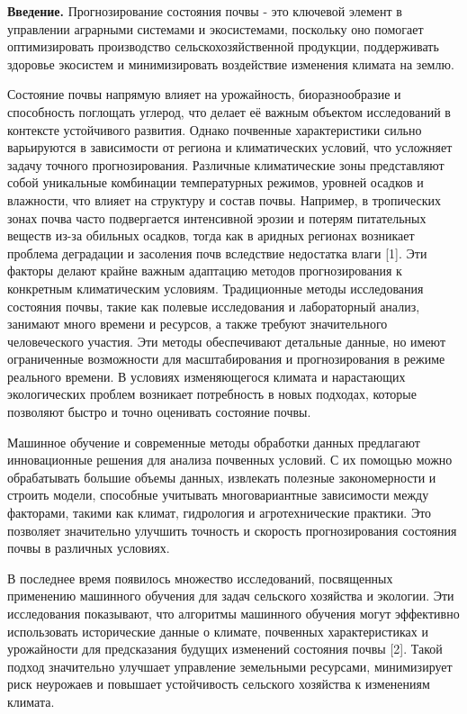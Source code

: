 \begin{multicols}{2}
{\bfseries Введение.} Прогнозирование состояния почвы - это ключевой
элемент в управлении аграрными системами и экосистемами, поскольку оно
помогает оптимизировать производство сельскохозяйственной продукции,
поддерживать здоровье экосистем и минимизировать воздействие изменения
климата на землю.

Состояние почвы напрямую влияет на урожайность, биоразнообразие и
способность поглощать углерод, что делает её важным объектом
исследований в контексте устойчивого развития. Однако почвенные
характеристики сильно варьируются в зависимости от региона и
климатических условий, что усложняет задачу точного прогнозирования.
Различные климатические зоны представляют собой уникальные комбинации
температурных режимов, уровней осадков и влажности, что влияет на
структуру и состав почвы. Например, в тропических зонах почва часто
подвергается интенсивной эрозии и потерям питательных веществ из-за
обильных осадков, тогда как в аридных регионах возникает проблема
деградации и засоления почв вследствие недостатка влаги {[}1{]}. Эти
факторы делают крайне важным адаптацию методов прогнозирования к
конкретным климатическим условиям. Традиционные методы исследования
состояния почвы, такие как полевые исследования и лабораторный анализ,
занимают много времени и ресурсов, а также требуют значительного
человеческого участия. Эти методы обеспечивают детальные данные, но
имеют ограниченные возможности для масштабирования и прогнозирования в
режиме реального времени. В условиях изменяющегося климата и нарастающих
экологических проблем возникает потребность в новых подходах, которые
позволяют быстро и точно оценивать состояние почвы.

Машинное обучение и современные методы обработки данных предлагают
инновационные решения для анализа почвенных условий. С их помощью можно
обрабатывать большие объемы данных, извлекать полезные закономерности и
строить модели, способные учитывать многовариантные зависимости между
факторами, такими как климат, гидрология и агротехнические практики. Это
позволяет значительно улучшить точность и скорость прогнозирования
состояния почвы в различных условиях.

В последнее время появилось множество исследований, посвященных
применению машинного обучения для задач сельского хозяйства и экологии.
Эти исследования показывают, что алгоритмы машинного обучения могут
эффективно использовать исторические данные о климате, почвенных
характеристиках и урожайности для предсказания будущих изменений
состояния почвы {[}2{]}. Такой подход значительно улучшает управление
земельными ресурсами, минимизирует риск неурожаев и повышает
устойчивость сельского хозяйства к изменениям климата.


\end{multicols}
